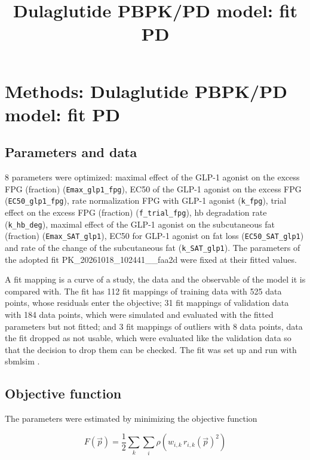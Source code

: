 \documentclass{article}
\title{Dulaglutide PBPK/PD model: fit PD}
\date{}
\begin{document}
\maketitle

\section{Methods: Dulaglutide PBPK/PD model: fit PD}

\subsection{Parameters and data}

8 parameters were optimized: maximal effect of the GLP-1 agonist on the excess FPG (fraction) (\texttt{Emax\_glp1\_fpg}), EC50 of the GLP-1 agonist on the excess FPG (\texttt{EC50\_glp1\_fpg}), rate normalization FPG with GLP-1 agonist (\texttt{k\_fpg}), trial effect on the excess FPG (fraction) (\texttt{f\_trial\_fpg}), hb degradation rate (\texttt{k\_hb\_deg}), maximal effect of the GLP-1 agonist on the subcutaneous fat (fraction) (\texttt{Emax\_SAT\_glp1}), EC50 for GLP-1 agonist on fat loss (\texttt{EC50\_SAT\_glp1}) and rate of the change of the subcutaneous fat (\texttt{k\_SAT\_glp1}). The parameters of the adopted fit PK\_20261018\_102441\_\_faa2d were fixed at their fitted values.

A fit mapping is a curve of a study, the data and the observable of the model it is compared with. The fit has 112 fit mappings of training data with 525 data points, whose residuals enter the objective; 31 fit mappings of validation data with 184 data points, which were simulated and evaluated with the fitted parameters but not fitted; and 3 fit mappings of outliers with 8 data points, data the fit dropped as not usable, which were evaluated like the validation data so that the decision to drop them can be checked. The fit was set up and run with sbmlsim \cite{Koenig2026_sbmlsim}.

\subsection{Objective function}

The parameters were estimated by minimizing the objective function

\begin{equation}
F(\vec{p}) = \frac{1}{2} \sum_{k} \sum_{i} \rho\left(w_{i,k}\, r_{i,k}(\vec{p})^2\right)
\end{equation}
\end{document}
